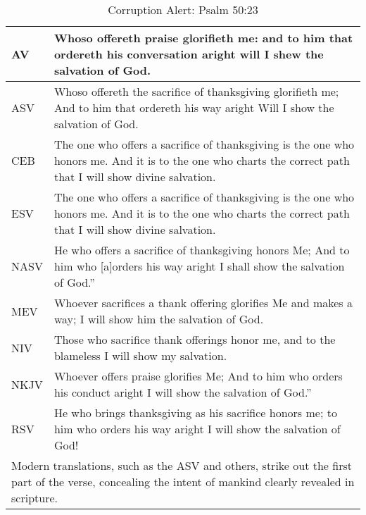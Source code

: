 \begin{center}

\begin{table}[ht]
\centering
\begin{tabular}{|p{.5in}|p{3.5in}|}
\hline

\textcolor[rgb]{0.00,0.00,1.00}{AV} & \textcolor[rgb]{0.00,0.00,1.00}{Whoso offereth praise glorifieth me: and to him that ordereth his conversation aright will I shew the salvation of God.} \\ \hline 

\hline
\hline


ASV &  Whoso offereth the sacrifice of thanksgiving glorifieth me; And to him that ordereth his way aright Will I show the salvation of God. \\ \hline
CEB &  The one who offers a sacrifice of thanksgiving is the one who honors me.  And it is to the one who charts the correct path that I will show divine salvation.\\ \hline
ESV & The one who offers a sacrifice of thanksgiving is the one who honors me.     And it is to the one who charts the correct path that I will show divine salvation. \\ \hline
NASV &  He who offers a sacrifice of thanksgiving honors Me; And to him who [a]orders his way aright I shall show the salvation of God.” \\ \hline
MEV & Whoever sacrifices a thank offering  glorifies Me and makes a way;  I will show him the salvation of God.\\ \hline
NIV &  Those who sacrifice thank offerings honor me,  and to the blameless I will show my salvation.\\ \hline
NKJV &  Whoever offers praise glorifies Me; And to him who orders his conduct aright I will show the salvation of God.”\\ \hline
RSV &  He who brings thanksgiving as his sacrifice honors me;   to him who orders his way aright  I will show the salvation of God!\\ \hline

\hline
\hline

\multicolumn{2}{|p{4.3in}|}{{\textcolor{jungle}{Modern translations, such as the ASV and others, strike out the first part of the verse, concealing the intent of mankind clearly revealed in scripture.}}} \\ \hline

\end{tabular}
\caption[Corruption Alert: Psalm 50:23]{Corruption Alert: Psalm 50:23} \label{table:Corruption Psalm 50:23}

\end{table}

\end{center}
